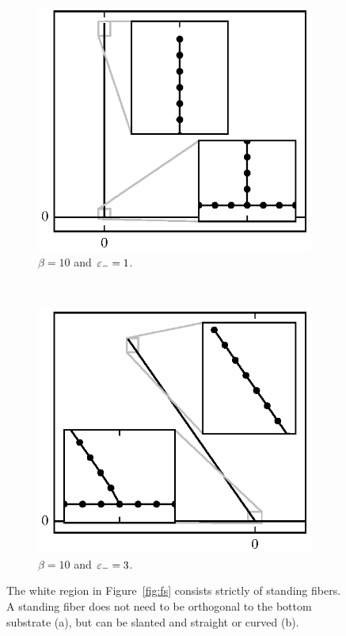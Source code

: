 	\begin{figure}[t!]
		\centering
		\begin{subfigure}{.5\textwidth}
			\centering
			\includegraphics{./fig/ch3/fs/b10_eb1.eps}
			\caption{$\beta=10$ and $\varepsilon_-=1$.\label{subfig:erect}}
		\end{subfigure}%
		~
		\begin{subfigure}{.5\textwidth}
			\centering
			\includegraphics{./fig/ch3/fs/b10_eb3.eps}
			\caption{$\beta=10$ and $\varepsilon_-=3$.\label{subfig:leaning}}
		\end{subfigure}
		\caption{The white region in Figure~\ref{fig:fs} consists strictly of standing fibers. A standing fiber does not need to be orthogonal to the bottom substrate (a), but can be slanted and straight or curved (b).\label{fig:alert}}
	\end{figure}

